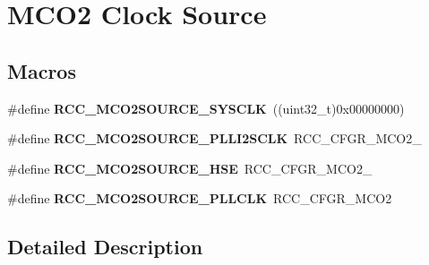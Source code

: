 \hypertarget{group___r_c_c___m_c_o2___clock___source}{}\section{M\+C\+O2 Clock Source}
\label{group___r_c_c___m_c_o2___clock___source}
\subsection*{Macros}
\begin{DoxyCompactItemize}
\item 
\#define {\bfseries R\+C\+C\+\_\+\+M\+C\+O2\+S\+O\+U\+R\+C\+E\+\_\+\+S\+Y\+S\+C\+LK}~((uint32\+\_\+t)0x00000000)\hypertarget{group___r_c_c___m_c_o2___clock___source_ga54de4030872bb1307c7d7c8a3bd33131}{}\label{group___r_c_c___m_c_o2___clock___source_ga54de4030872bb1307c7d7c8a3bd33131}

\item 
\#define {\bfseries R\+C\+C\+\_\+\+M\+C\+O2\+S\+O\+U\+R\+C\+E\+\_\+\+P\+L\+L\+I2\+S\+C\+LK}~R\+C\+C\+\_\+\+C\+F\+G\+R\+\_\+\+M\+C\+O2\+\_\hypertarget{group___r_c_c___m_c_o2___clock___source_ga02b34da36ca51681c7d5fb62d8f9b04b}{}\label{group___r_c_c___m_c_o2___clock___source_ga02b34da36ca51681c7d5fb62d8f9b04b}

\item 
\#define {\bfseries R\+C\+C\+\_\+\+M\+C\+O2\+S\+O\+U\+R\+C\+E\+\_\+\+H\+SE}~R\+C\+C\+\_\+\+C\+F\+G\+R\+\_\+\+M\+C\+O2\+\_\hypertarget{group___r_c_c___m_c_o2___clock___source_gade7c384e5e76c52d76b589297a8a6934}{}\label{group___r_c_c___m_c_o2___clock___source_gade7c384e5e76c52d76b589297a8a6934}

\item 
\#define {\bfseries R\+C\+C\+\_\+\+M\+C\+O2\+S\+O\+U\+R\+C\+E\+\_\+\+P\+L\+L\+C\+LK}~R\+C\+C\+\_\+\+C\+F\+G\+R\+\_\+\+M\+C\+O2\hypertarget{group___r_c_c___m_c_o2___clock___source_ga706e33338111d8ef82b00a54eba0215c}{}\label{group___r_c_c___m_c_o2___clock___source_ga706e33338111d8ef82b00a54eba0215c}

\end{DoxyCompactItemize}


\subsection{Detailed Description}
